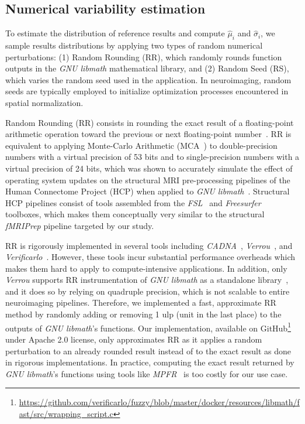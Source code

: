 \documentclass[lettersize,journal]{IEEEtran}
\newcommand{\fmriprep}{\emph{fMRIPrep}\xspace}
\begin{document}
\subsection{Numerical variability estimation}  %
\label{subsec:numerical_variablity_model}

To estimate the distribution of reference results and compute $\hat \mu_i$ and
$\hat \sigma_i$, we sample results distributions by applying two types of
random numerical perturbations: (1) Random Rounding (RR), which randomly rounds
function outputs in the \emph{GNU libmath} mathematical library, and (2) Random
Seed (RS), which varies the random seed used in the application. In
neuroimaging, random seeds are typically employed to initialize optimization
processes encountered in spatial normalization.

Random Rounding (RR) consists in rounding the exact result of a floating-point
arithmetic operation toward the previous or next floating-point
number~\cite{forsythe1959reprint}. RR is equivalent to applying Monte-Carlo
Arithmetic (MCA~\cite{parker1997monte}) to double-precision numbers with a
virtual precision of 53 bits and to single-precision numbers with a virtual
precision of 24 bits, which was shown to accurately simulate the effect of
operating system updates on the structural MRI pre-processing pipelines of the
Human Connectome Project (HCP) when applied to \emph{GNU
  libmath}~\cite{salari2021accurate}. Structural HCP pipelines consist of tools
assembled from the \emph{FSL}~\cite{jenkinson2012fsl} and
\emph{Freesurfer}~\cite{fischl2012freesurfer} toolboxes, which makes them
conceptually very similar to the structural \fmriprep pipeline targeted by our
study.

RR is rigorously implemented in several tools including
\emph{CADNA}~\cite{jezequel2008cadna}, \emph{Verrou}~\cite{fevotte2016verrou},
and \emph{Verificarlo}~\cite{denis2016verificarlo}. However, these tools incur
substantial performance overheads which makes them hard to apply to
compute-intensive applications. In addition, only \emph{Verrou} supports RR
instrumentation of \emph{GNU libmath} as a standalone
library~\cite{fevotte2019debugging}, and it does so by relying on quadruple
precision, which is not scalable to entire neuroimaging pipelines. Therefore,
we implemented a fast, approximate RR method by randomly adding or removing 1
ulp (unit in the last place) to the outputs of \emph{GNU libmath}'s functions.
Our implementation, available on
GitHub\footnote{\url{https://github.com/verificarlo/fuzzy/blob/master/docker/resources/libmath/fast/src/wrapping\_script.c}}
under Apache 2.0 license, only approximates RR as it applies a random
perturbation to an already rounded result instead of to the exact result as
done in rigorous implementations. In practice, computing the exact result
returned by \emph{GNU libmath}'s functions using tools like
\emph{MPFR}~\cite{fousse2007mpfr} is too costly for our use case.
\end{document}
